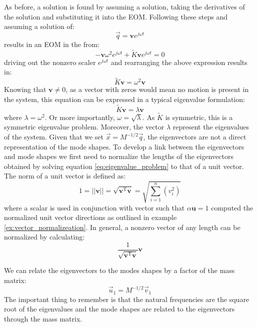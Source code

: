 \documentclass[12pt,letter]{article}
\numberwithin{ex}{section} %
\numberwithin{re}{section} %
\begin{document}
As before, a solution is found by assuming a solution, taking the derivatives of the solution and substituting it into the EOM. Following these steps and assuming a solution of:
\begin{equation}
\vec{q} = \textbf{v}e^{j\omega t}
\end{equation}
results in an EOM in the from:
\begin{equation}
-\textbf{v} \omega^2 e^{j\omega t} + \widetilde{K}\textbf{v}e^{j\omega t} =0
\end{equation}
driving out the nonzero scaler $e^{j\omega t}$ and rearranging the above expression results in:
\begin{equation}
\widetilde{K}\textbf{v} =  \omega^2 \textbf{v}
\end{equation}
Knowing that $\textbf{v}\neq0$, as a vector with zeros would mean no motion is present in the system, this equation can be expressed in a typical eigenvalue formulation:
\begin{equation}
\widetilde{K}\textbf{v} =  \lambda \textbf{v}
\label{eq:eigenvalue_problem}
\end{equation}
where $\lambda = \omega^2 $. Or more importantly, $\omega = \sqrt{\lambda}$. As $\widetilde{K}$ is symmetric, this is a symmetric eigenvalue problem. Moreover, the vector $\lambda$ represent the eigenvalues of the system. Given that  we set $\vec{x}=M^{-1/2}\vec{q}$, the eigenvectors are not a direct representation of the mode shapes. To develop a link between the eigenvectors and mode shapes we first need to normalize the lengths of the eigenvectors obtained by solving equation \ref{eq:eigenvalue_problem} to that of a unit vector. The norm of a unit vector is defined as:
\begin{equation}
1= ||\textbf{v}|| = \sqrt{\textbf{v}^{\text{T}}\textbf{v}} = \sqrt{\sum_{i=1}^{n}(v_i^2)}
\end{equation} 
where a scalar is used in conjunction with vector such that $\alpha\textbf{u}=1$ computed the normalized unit vector directions as outlined in example \ref{ex:vector_normalizeation}. In general, a nonzero vector of any length can be normalized by calculating:
\begin{equation}
\frac{1}{\sqrt{\textbf{v}^{\text{T}}\textbf{v}} } \textbf{v}
\end{equation} 


We can relate the eigenvectors to the modes shapes by a factor of the mass matrix:
\begin{equation}
\vec{u}_1 = M^{-1/2}\vec{v}_1
\label{eq:modeshape_to_eigenvector}
\end{equation}
The important thing to remember is that the natural frequencies are the square root of the eigenvalues and the mode shapes are related to the eigenvectors through the mass matrix. 
\end{document}
